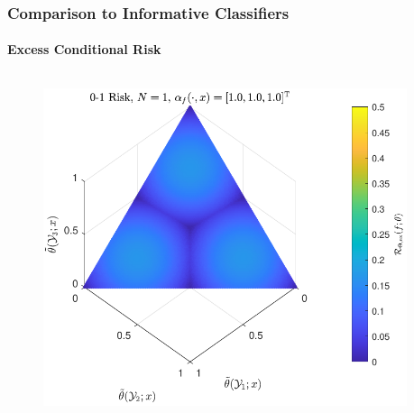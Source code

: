 \documentclass[aspectratio=169]{beamer}
\begin{document}
\begin{frame}
\begin{columns}[T]
\begin{column}{.5\linewidth}
\end{column}

\end{columns}

\vspace{1.8em}
\centering
{}

\end{frame}



\begin{frame}
\frametitle{Comparison to Informative Classifiers}
\framesubtitle{Excess Conditional Risk}

\vspace{-1em}
\begin{columns}[c]

\begin{column}{.5\linewidth}

\begin{figure}
\centering
\includegraphics[width=0.8\linewidth]{Risk_cond_ex_01_Dir_theta__uni_clim.pdf}
\label{fig:Risk_cond_ex_01_Dir_theta__uni}
\end{figure}

\end{column}

\begin{column}{.5\linewidth}


\end{column}
\end{columns}
\end{frame}
\end{document}
